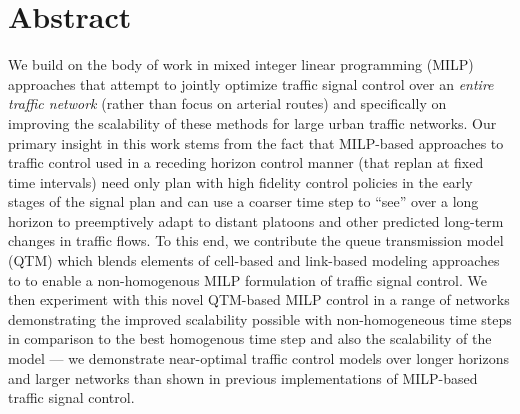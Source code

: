\section*{Abstract}


We build on the body of work in mixed integer linear programming
(MILP) approaches that attempt to jointly optimize traffic signal
control over an \emph{entire traffic network} (rather than focus on
arterial routes) and specifically on improving the scalability of
these methods for large urban traffic networks.  Our primary insight
in this work stems from the fact that MILP-based approaches to traffic
control used in a receding horizon control manner (that replan at
fixed time intervals) need only plan with high fidelity control
policies in the early stages of the signal plan and can use a coarser
time step to ``see'' over a long horizon to preemptively adapt to
distant platoons and other predicted long-term changes in traffic
flows.  To this end, we contribute the queue transmission model (QTM)
which blends elements of cell-based and link-based modeling approaches
to to enable a non-homogenous MILP formulation of traffic signal
control.  We then experiment with this novel QTM-based MILP control in
a range of networks demonstrating the improved scalability possible
with non-homogeneous time steps in comparison to the best homogenous
time step and also the scalability of the model --- we demonstrate
near-optimal traffic control models over longer horizons and larger
networks than shown in previous implementations of MILP-based traffic
signal control.


